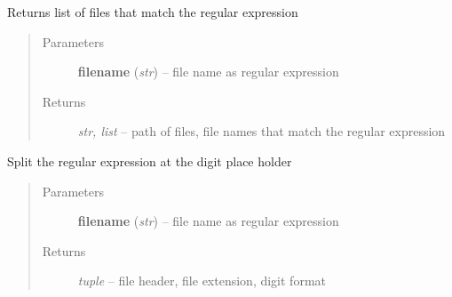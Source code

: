 \documentclass[letterpaper,10pt,english]{sphinxmanual}
\begin{document}
\begin{fulllineitems}
\label{api/ClearMap.IO:ClearMap.IO.FileList.readFileList}
Returns list of files that match the regular expression
\begin{quote}\begin{description}
\item[{Parameters}] \leavevmode
\textbf{filename} (\emph{str}) --
file name as regular expression

\item[{Returns}] \leavevmode
\emph{str, list} --
path of files, file names that match the regular expression

\end{description}\end{quote}

\end{fulllineitems}


\begin{fulllineitems}
\label{api/ClearMap.IO:ClearMap.IO.FileList.splitFileExpression}
Split the regular expression at the digit place holder
\begin{quote}\begin{description}
\item[{Parameters}] \leavevmode
\textbf{filename} (\emph{str}) --
file name as regular expression

\item[{Returns}] \leavevmode
\emph{tuple} --
file header, file extension, digit format

\end{description}\end{quote}

\end{fulllineitems}

\end{document}
